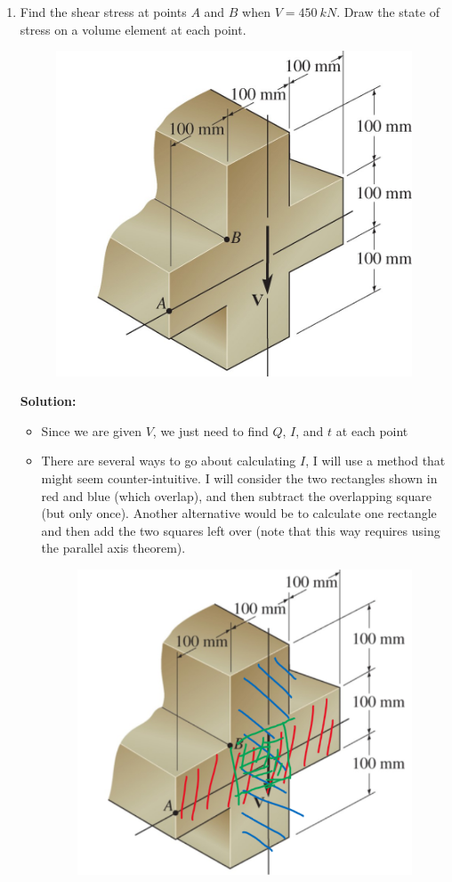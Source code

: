 \documentclass[12pt, oneside]{article}
\begin{document}
\begin{enumerate}
	\item %
		Find the shear stress at points $A$ and $B$ when $V = 	\SI{450}{kN} $.
		Draw the state of stress on a volume element at each point.
		\begin{figure}[H]
			\centering
			\includegraphics[width=0.6\linewidth]{f7-2}
		\end{figure}
			\textbf{Solution:}
			\begin{itemize}
				\item Since we are given $V$, we just need to find $Q$, $I$, and $t$ at each point
				\item There are several ways to go about calculating $I$, I will use a method that might seem counter-intuitive.
					I will consider the two rectangles shown in red and blue (which overlap), and then subtract the overlapping square (but only once).
					Another alternative would be to calculate one rectangle and then add the two squares left over (note that this way requires using the parallel axis theorem).
					\begin{figure}[H]
						\centering
						\includegraphics[width=0.6\linewidth]{6-1a}

\end{figure}
\end{itemize}
\end{enumerate}
\end{document}
